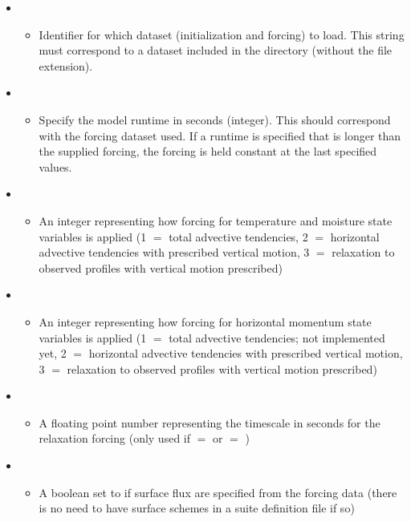 \begin{itemize}
\item {}
	\begin{itemize}
	\item Identifier for which dataset (initialization and forcing) to load. This string must correspond to a dataset included in the directory  (without the file extension).
	\end{itemize}
\item {}
	\begin{itemize}
	\item Specify the model runtime in seconds (integer). This should correspond with the forcing dataset used. If a runtime is specified that is longer than the supplied forcing, the forcing is held constant at the last specified values.
	\end{itemize}
\item {}
	\begin{itemize}
	\item An integer representing how forcing for temperature and moisture state variables is applied (1 $=$ total advective tendencies, 2 $=$ horizontal advective tendencies with prescribed vertical motion, 3 $=$ relaxation to observed profiles with vertical motion prescribed)
	\end{itemize}
\item {}
	\begin{itemize}
	\item An integer representing how forcing for horizontal momentum state variables is applied (1 $=$ total advective tendencies; not implemented yet, 2 $=$ horizontal advective tendencies with prescribed vertical motion, 3 $=$ relaxation to observed profiles with vertical motion prescribed)
	\end{itemize}
\item {}
	\begin{itemize}
	\item A floating point number representing the timescale in seconds for the relaxation forcing (only used if  $=$  or  $=$ )
	\end{itemize}
\item {}
	\begin{itemize}
	\item A boolean set to  if surface flux are specified from the forcing data (there is no need to have surface schemes in a suite definition file if so)

\end{itemize}
\end{itemize}
